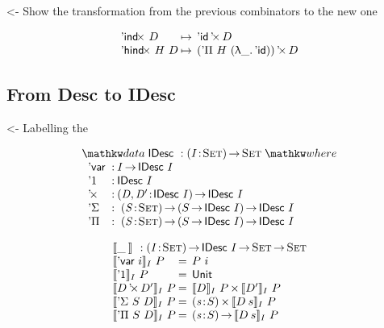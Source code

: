 \documentclass[preprint, authoryear]{sigplanconf}
\newenvironment{structure}{\footnotesize\verbatim}{\endverbatim}
\begin{document}
\begin{structure}
<- Show the transformation from the previous combinators to the new one
\end{structure}

\[\begin{array}{l@{\:\mapsto\:\:}l}
\DIndx{D}         & \DProd{\DId}{D}                      \\
\DHindx{H}{D}     & \DProd{(\DPi{H}{(\LAM{\_} \DId)})}{D}
\end{array}
\]


\subsection{From Desc to IDesc}

\begin{structure}
<- Labelling the \DId
\end{structure}

\[
\stk{
\data \IDesc{} : \PI{\V{I}}{\Set}{\Set} \where \\
\;\;\begin{array}{@{}l@{\::\:}l@{\quad}l}
    \DVar           & I \To \IDesc{I}                                   \\
    \DUnit          & \IDesc{I}                                         \\
    \DProd{}{}      & \PI{\V{D}, \V{D'}}{\IDesc{I}} \IDesc{I}           \\
    \DSigma         & \PI{\V{S}}{\Set} \PIS{S \To \IDesc{I}} \IDesc{I}  \\
    \DPi            & \PI{\V{S}}{\Set} \PIS{S \To \IDesc{I}} \IDesc{I} 
\end{array}
}
\]


\[\stk{
\idescop{\_\:}{}{} : \PI{\V{I}}{\Set} \IDesc{I} \To \Set \To \Set          \\
\begin{array}{@{}l@{\:=\:\:}ll}
\idescop{\DVar{i}}{I}{P}      &  P~i                                         \\
\idescop{\DUnit}{I}{P}        &  \Unit                                       \\
\idescop{\DProd{D}{D'}}{I}{P} &  \TIMES{\idescop{D}{I}{P}}{\idescop{D'}{I}{P}}       \\
\idescop{\DSigma{S}{D}}{I}{P} &  \SIGMA{\V{s}}{S} \idescop{D\: s}{I}{P}                \\
\idescop{\DPi{S}{D}}{I}{P}    &  \PI{\V{s}}{S} \idescop{D\: s}{I}{P}            
\end{array}
}\]
\end{document}

